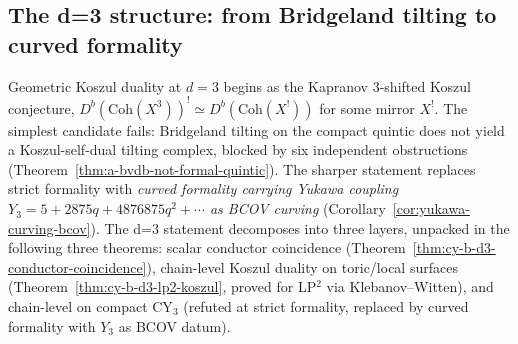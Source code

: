 \subsection*{The d=3 structure: from Bridgeland tilting to curved
 formality}
\label{subsec:cy-b-d3-structure}

Geometric Koszul duality at $d = 3$ begins as the Kapranov 3-shifted
Koszul conjecture, $D^b(\mathrm{Coh}(X^3))^! \simeq D^b(\mathrm{Coh}(X^!))$
for some mirror $X^!$. The simplest candidate fails: Bridgeland tilting
on the compact quintic does not yield a Koszul-self-dual tilting
complex, blocked by six independent obstructions
(Theorem~\ref{thm:a-bvdb-not-formal-quintic}). The sharper statement
replaces strict formality with \emph{curved formality carrying Yukawa
coupling $Y_3 = 5 + 2875 q + 4876875 q^2 + \cdots$ as BCOV curving}
(Corollary~\ref{cor:yukawa-curving-bcov}). The d=3 statement decomposes
into three layers, unpacked in the following three theorems:
scalar conductor coincidence
(Theorem~\ref{thm:cy-b-d3-conductor-coincidence}), chain-level
Koszul duality on toric/local surfaces
(Theorem~\ref{thm:cy-b-d3-lp2-koszul}, proved for LP$^2$ via
Klebanov--Witten), and chain-level on compact CY$_3$ (refuted at strict
formality, replaced by curved formality with $Y_3$ as BCOV datum).

